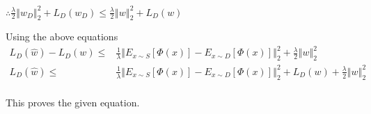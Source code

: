 \documentclass{article}
\begin{document}
\begin{description}
    $\therefore \frac{\lambda}{2}\left\Vert w_{D}\right\Vert _{2}^{2}+L_{D}(w_{D})\leq\frac{\lambda}{2}\left\Vert w\right\Vert _{2}^{2}+L_{D}(w)$

    Using the above equations
    \begin{align*}
      L_{D}(\hat{w})-L_{D}(w) \leq & \frac{1}{\lambda}\left\Vert E_{x\sim S}\left[\Phi(x)\right]-E_{x\sim D}\left[\Phi(x)\right]\right\Vert _{2}^{2}+\frac{\lambda}{2}\left\Vert w\right\Vert _{2}^{2} \\
      L_{D}(\hat{w}) \leq & \frac{1}{\lambda}\left\Vert E_{x\sim S}\left[\Phi(x)\right]-E_{x\sim D}\left[\Phi(x)\right]\right\Vert _{2}^{2}+L_{D}(w)+\frac{\lambda}{2}\left\Vert w\right\Vert _{2}^{2}\\
    \end{align*}

    This proves the given equation.
\end{description}
\end{document}
